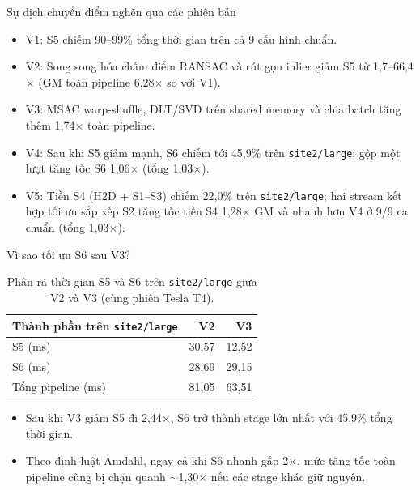 \begin{frame}{Sự dịch chuyển điểm nghẽn qua các phiên bản}
\begin{itemize}
\item V1: S5 chiếm 90--99\% tổng thời gian trên cả 9 cấu hình chuẩn.
\item V2: Song song hóa chấm điểm RANSAC và rút gọn inlier giảm S5 từ 1,7--66,4$\times$ (GM toàn pipeline 6,28$\times$ so với V1).
\item V3: MSAC warp-shuffle, DLT/SVD trên shared memory và chia batch tăng thêm 1,74$\times$ toàn pipeline.
\item V4: Sau khi S5 giảm mạnh, S6 chiếm tới 45,9\% trên \texttt{site2/large}; gộp một lượt tăng tốc S6 1,06$\times$ (tổng 1,03$\times$).
\item V5: Tiền S4 (H2D + S1--S3) chiếm 22,0\% trên \texttt{site2/large}; hai stream kết hợp tối ưu sắp xếp S2 tăng tốc tiền S4 1,28$\times$ GM và nhanh hơn V4 ở 9/9 ca chuẩn (tổng 1,03$\times$).
\end{itemize}
\end{frame}

\begin{frame}{Vì sao tối ưu S6 sau V3?}
\begin{table}
\centering
\caption{Phân rã thời gian S5 và S6 trên \texttt{site2/large} giữa V2 và V3 (cùng phiên Tesla T4).}
\begin{tabular}{lrr}
\toprule
Thành phần trên \texttt{site2/large} & V2 & V3 \\
\midrule
S5 (ms) & 30,57 & 12,52 \\
S6 (ms) & 28,69 & 29,15 \\
Tổng pipeline (ms) & 81,05 & 63,51 \\
\bottomrule
\end{tabular}
\end{table}
\begin{itemize}
\item Sau khi V3 giảm S5 đi 2,44$\times$, S6 trở thành stage lớn nhất với 45,9\% tổng thời gian.
\item Theo định luật Amdahl, ngay cả khi S6 nhanh gấp 2$\times$, mức tăng tốc toàn pipeline cũng bị chặn quanh $\sim$1,30$\times$ nếu các stage khác giữ nguyên.
\end{itemize}
\end{frame}

